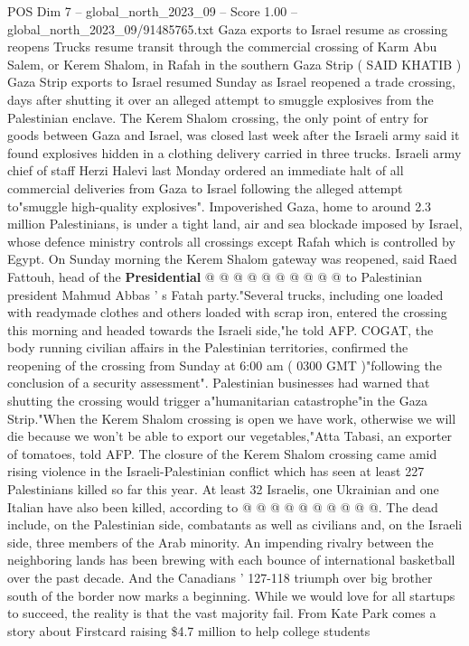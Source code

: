 \begin{textsample}{POS Dim 7 – global\_north\_2023\_09 – Score 1.00 – global\_north\_2023\_09/91485765.txt}  \label{ex:f7_pos_370}
Gaza exports to Israel resume as crossing reopens Trucks resume transit through the commercial crossing of Karm Abu Salem, or Kerem Shalom, in Rafah in the southern Gaza Strip ( SAID KHATIB ) Gaza Strip exports to Israel resumed Sunday as Israel reopened a trade crossing, days after shutting it over an alleged attempt to smuggle explosives from the Palestinian enclave.
The Kerem Shalom crossing, the only point of entry for goods between Gaza and Israel, was closed last week after the Israeli army said it found explosives hidden in a clothing delivery carried in three trucks.
Israeli army chief of staff Herzi Halevi last Monday ordered an immediate halt of all commercial deliveries from Gaza to Israel following the alleged attempt to"smuggle high-quality explosives".
Impoverished Gaza, home to around 2.3 million Palestinians, is under a tight land, air and sea blockade imposed by Israel, whose defence ministry controls all crossings except Rafah which is controlled by Egypt.
On Sunday morning the Kerem Shalom gateway was reopened, said Raed Fattouh, head of the \textbf{Presidential} @ @ @ @ @ @ @ @ @ @ to Palestinian president Mahmud Abbas ' s Fatah party."Several trucks, including one loaded with readymade clothes and others loaded with scrap iron, entered the crossing this morning and headed towards the Israeli side,"he told AFP.
COGAT, the body running civilian affairs in the Palestinian territories, confirmed the reopening of the crossing from Sunday at 6:00 am ( 0300 GMT )"following the conclusion of a security assessment".
Palestinian businesses had warned that shutting the crossing would trigger a"humanitarian catastrophe"in the Gaza Strip."When the Kerem Shalom crossing is open we have work, otherwise we will die because we won't be able to export our vegetables,"Atta Tabasi, an exporter of tomatoes, told AFP.
The closure of the Kerem Shalom crossing came amid rising violence in the Israeli-Palestinian conflict which has seen at least 227 Palestinians killed so far this year.
At least 32 Israelis, one Ukrainian and one Italian have also been killed, according to @ @ @ @ @ @ @ @ @ @.
The dead include, on the Palestinian side, combatants as well as civilians and, on the Israeli side, three members of the Arab minority.
An impending rivalry between the neighboring lands has been brewing with each bounce of international basketball over the past decade.
And the Canadians ' 127-118 triumph over big brother south of the border now marks a beginning.
While we would love for all startups to succeed, the reality is that the vast majority fail.
From Kate Park comes a story about Firstcard raising \$4.7 million to help college students

\end{textsample}
